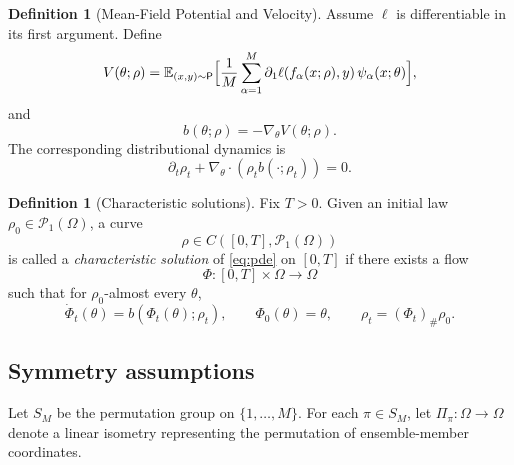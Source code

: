 \documentclass[11pt]{article}
\theoremstyle{definition}
\newtheorem{definition}[theorem]{Definition}
\newcommand{\E}{\mathbb{E}}
\newcommand{\PP}{\mathcal{P}}
\begin{document}
\begin{definition}[Mean-Field Potential and Velocity]
Assume $\ell$ is differentiable in its first argument.
Define
\[
  V(\theta;\rho)
  =
  \E_{(x,y)\sim \mathsf{P}}
  \Bigl[
    \frac1M \sum_{\alpha=1}^M
    \partial_1 \ell(f_\alpha(x;\rho),y)\,\psi_\alpha(x;\theta)
  \Bigr],
\]
and
\[
  b(\theta;\rho) = -\nabla_\theta V(\theta;\rho).
\]
The corresponding distributional dynamics is
\begin{equation}
  \partial_t \rho_t + \nabla_\theta \cdot (\rho_t b(\cdot;\rho_t)) = 0.
  \label{eq:pde}
\end{equation}
\end{definition}

\begin{definition}[Characteristic solutions]
\label{def:characteristic-solution}
Fix $T>0$.
Given an initial law $\rho_0\in\PP_1(\Omega)$, a curve
\[
  \rho\in C([0,T],\PP_1(\Omega))
\]
is called a \emph{characteristic solution} of \eqref{eq:pde} on $[0,T]$ if there exists a flow
\[
  \Phi:[0,T]\times\Omega\to\Omega
\]
such that for $\rho_0$-almost every $\theta$,
\[
  \dot{\Phi}_t(\theta)=b(\Phi_t(\theta);\rho_t),
  \qquad
  \Phi_0(\theta)=\theta,
  \qquad
  \rho_t=(\Phi_t)_\#\rho_0.
\]
\end{definition}

\subsection{Symmetry assumptions}

Let $S_M$ be the permutation group on $\{1,\dots,M\}$.
For each $\pi \in S_M$, let $\Pi_\pi:\Omega \to \Omega$ denote a linear isometry representing the permutation of ensemble-member coordinates.
\end{document}
